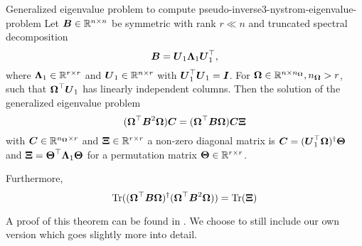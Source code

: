 \begin{theorem}{Generalized eigenvalue problem to compute pseudo-inverse}{3-nystrom-eigenvalue-problem}
    Let $\boldsymbol{B} \in \mathbb{R}^{n \times n}$ be symmetric with rank $r \ll n$ and
    truncated spectral decomposition 
    \begin{equation}
        \boldsymbol{B} = \boldsymbol{U}_1 \boldsymbol{\Lambda}_1 \boldsymbol{U}_1^{\top},
        \label{equ:3-nystrom-eigenvalue-problem-spectral-decomposition}
    \end{equation}
    where $\boldsymbol{\Lambda}_1 \in \mathbb{R}^{r \times r}$ and
    $\boldsymbol{U}_1 \in \mathbb{R}^{n \times r}$ with $\boldsymbol{U}_1^{\top} \boldsymbol{U}_1 = \boldsymbol{I}$.
    For $\boldsymbol{\Omega} \in \mathbb{R}^{n \times n_{\boldsymbol{\Omega}}}, n_{\boldsymbol{\Omega}} > r$,
    such that $\boldsymbol{\Omega}^{\top} \boldsymbol{U}_1$ has linearly independent columns.
    Then the solution of the generalized eigenvalue problem
    \begin{equation}
        (\boldsymbol{\Omega}^{\top} \boldsymbol{B}^2 \boldsymbol{\Omega}) \boldsymbol{C} = (\boldsymbol{\Omega}^{\top} \boldsymbol{B} \boldsymbol{\Omega}) \boldsymbol{C}  \boldsymbol{\Xi}
        \label{equ:low-rank-eigenvalue-problem}
    \end{equation}
    with $\boldsymbol{C} \in \mathbb{R}^{n_{\boldsymbol{\Omega}} \times r}$ and $\boldsymbol{\Xi} \in \mathbb{R}^{r \times r}$ a 
    non-zero diagonal matrix is $\boldsymbol{C} = (\boldsymbol{U}_1^{\top} \boldsymbol{\Omega})^{\dagger} \boldsymbol{\Theta}$
    and $\boldsymbol{\Xi} = \boldsymbol{\Theta}^{\top} \boldsymbol{\Lambda}_1 \boldsymbol{\Theta}$
    for a permutation matrix $\boldsymbol{\Theta} \in \mathbb{R}^{r \times r}$.

    Furthermore,
    \begin{equation}
        \operatorname{Tr}((\boldsymbol{\Omega}^{\top} \boldsymbol{B} \boldsymbol{\Omega})^{\dagger}(\boldsymbol{\Omega}^{\top} \boldsymbol{B}^2 \boldsymbol{\Omega})) = \operatorname{Tr}(\boldsymbol{\Xi})
        \label{equ:low-rank-trace-equalities}
    \end{equation}
\end{theorem}
A proof of this theorem can be found in \cite[theorem~3]{lin2017randomized}. We
choose to still include our own version which goes slightly more into detail.
